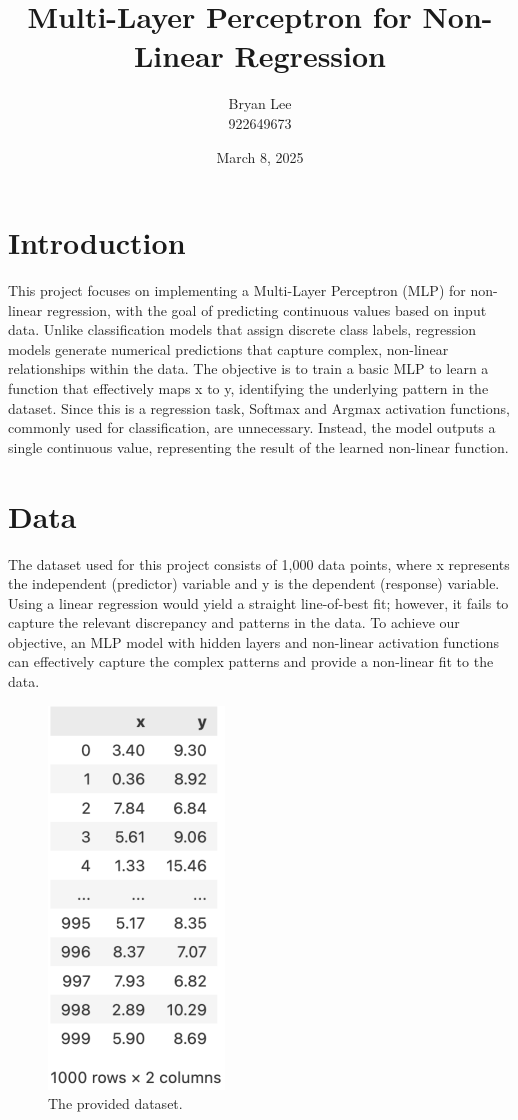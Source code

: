 \documentclass[12pt]{article}
\title{Multi-Layer Perceptron for Non-Linear Regression}
\author{Bryan Lee\\922649673}
\date{March 8, 2025}
\begin{document}
\maketitle
\thispagestyle{fancy}

\section{Introduction}
This project focuses on implementing a Multi-Layer Perceptron (MLP) for non-linear regression, with the goal of predicting continuous values based on input data.
Unlike classification models that assign discrete class labels, regression models generate numerical predictions that capture complex, non-linear relationships within the data.
The objective is to train a basic MLP to learn a function that effectively maps x to y, identifying the underlying pattern in the dataset.
Since this is a regression task, Softmax and Argmax activation functions, commonly used for classification, are unnecessary.
Instead, the model outputs a single continuous value, representing the result of the learned non-linear function.

\section{Data}
The dataset used for this project consists of 1,000 data points, where x represents the independent (predictor) variable and y is the dependent (response) variable.
Using a linear regression would yield a straight line-of-best fit; however, it fails to capture the relevant discrepancy and patterns in the data.
To achieve our objective, an MLP model with hidden layers and non-linear activation functions can effectively capture the complex patterns and provide a non-linear fit to the data.

\begin{figure}[ht]
    \centering
    \includegraphics[width=0.2\linewidth]{DataSet.PNG}
    \caption{The provided dataset.}
\end{figure}
\end{document}
